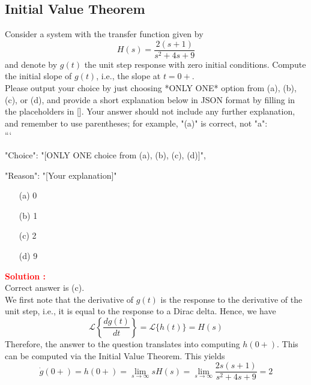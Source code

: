 \documentclass[12pt]{article}
\begin{document}
\clearpage
\subsection{Initial Value Theorem}

Consider a system with the transfer function given by
\begin{equation}
H(s) = \frac{2(s + 1)}{s^2 + 4s + 9}
\end{equation}
and denote by \(g(t)\) the unit step response with zero initial conditions. Compute the initial slope of \(g(t)\), i.e., the slope at \(t = 0+\).\\
Please output your choice by just choosing *ONLY ONE* option from (a), (b), (c), or (d), and provide a short explanation below in JSON format by filling in the placeholders in []. Your answer should not include any further explanation, and remember to use parentheses; for example, "(a)" is correct, not "a":\\

```
{

"Choice": "[ONLY ONE choice from (a), (b), (c), (d)]",

"Reason": "[Your explanation]"

}
\begin{itemize}
    \item[(a)] 0
    \item[(b)] 1
    \item[(c)] 2
    \item[(d)] 9
\end{itemize}

\textbf{\textcolor{red}{Solution :}} \\
Correct answer is (c).\\
We first note that the derivative of \(g(t)\) is the response to the derivative of the unit step, i.e., it is equal to the response to a Dirac delta. Hence, we have
\begin{equation}
\mathcal{L}\left\{ \frac{dg(t)}{dt} \right\} = \mathcal{L}\{h(t)\} = H(s)
\end{equation}
Therefore, the answer to the question translates into computing \(h(0+)\). This can be computed via the Initial Value Theorem. This yields
\begin{equation}
\dot{g}(0+) = h(0+) = \lim_{s \to \infty} sH(s) = \lim_{s \to \infty} \frac{2s(s + 1)}{s^2 + 4s + 9} = 2
\end{equation}

\clearpage
\end{document}
